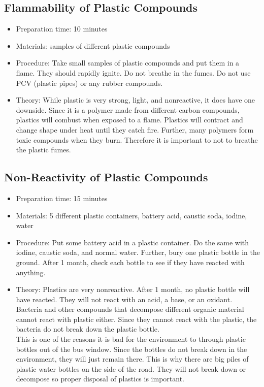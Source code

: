 \subsection{Flammability of Plastic Compounds}
\begin{itemize}
\item{Preparation time: 10 minutes}
\item{Materials: samples of different plastic compounds}
\item{Procedure: Take small samples of plastic compounds and put them in a flame. They should rapidly ignite. Do not breathe in the fumes. Do not use PCV (plastic pipes) or any rubber compounds.}
\item{Theory: While plastic is very strong, light, and nonreactive, it does have one downside. Since it is a polymer made from different carbon compounds, plastics will combust when exposed to a flame. Plastics will contract and change shape under heat until they catch fire. Further, many polymers form toxic compounds when they burn. Therefore it is important to not to breathe the plastic fumes.}
\end{itemize}

\subsection{Non-Reactivity of Plastic Compounds}
\begin{itemize}
\item{Preparation time: 15 minutes}
\item{Materials: 5 different plastic containers, battery acid, caustic soda, iodine, water}
\item{Procedure: Put some battery acid in a plastic container. Do the same with iodine, caustic soda, and normal water. Further, bury one plastic bottle in the ground. After 1 month, check each bottle to see if they have reacted with anything.}
\item{Theory: Plastics are very nonreactive. After 1 month, no plastic bottle will have reacted. They will not react with an acid, a base, or an oxidant. Bacteria and other compounds that decompose different organic material cannot react with plastic either. Since they cannot react with the plastic, the bacteria do not break down the plastic bottle.\\
This is one of the reasons it is bad for the environment to through plastic bottles out of the bus window. Since the bottles do not break down in the environment, they will just remain there. This is why there are big piles of plastic water bottles on the side of the road. They will not break down or decompose so proper disposal of plastics is important.}
\end{itemize}

